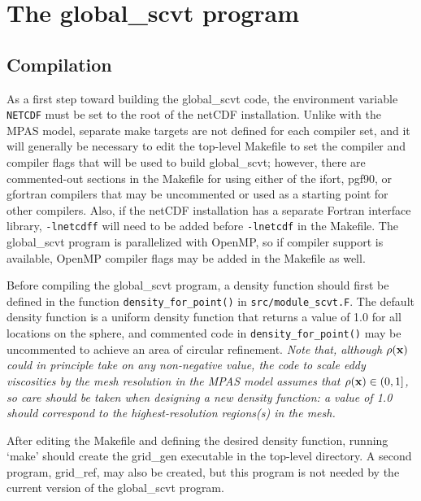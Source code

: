 \section{The global\_scvt program}
\label{sec:global_scvt}

\subsection{Compilation}
                                                                                             
As a first step toward building the global\_scvt code, the environment variable                     
{\tt NETCDF} must be set to the root of the netCDF installation. Unlike with the MPAS model, separate make targets are not
defined for each compiler set, and it will generally be necessary to edit the top-level Makefile to set the compiler and compiler flags                 
that will be used to build global\_scvt; however, there are commented-out sections in the Makefile for using either of the ifort, pgf90, or gfortran compilers that may be uncommented or used as a starting point for other compilers. Also, if the netCDF installation has a separate Fortran interface library, {\tt -lnetcdff} will need to be added before {\tt -lnetcdf} in the Makefile. The global\_scvt program is parallelized with OpenMP, so if compiler support is available, OpenMP compiler flags may be added
in the Makefile as well.                      

Before compiling the global\_scvt program, a density function should first be defined in the function {\tt density\_for\_point()} in {\tt src/module\_scvt.F}. The default density function is a uniform density function that returns a value of 1.0 for all locations
on the sphere, and commented code in {\tt density\_for\_point()} may be uncommented to achieve an area of circular refinement. {\em Note that, although $\rho({\bf x})$ could in principle take on any non-negative value, the code to scale eddy viscosities by the mesh resolution in the MPAS model assumes that $\rho({\bf x}) \in (0,1]$, so care should be taken when designing a new density function: a value of 1.0 should correspond to the highest-resolution regions(s) in the mesh.}                                      
                                                                                                
After editing the Makefile and defining the desired density function, running `make' should create the grid\_gen executable 
in the top-level directory. A second program, grid\_ref, may also be created, but this program is not needed by the current version 
of the global\_scvt program.


